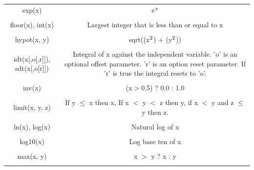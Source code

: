 \begin{longtable}{c c}
exp(x) & \begin{minipage}{20em}
e$\rm{^x}$
\end{minipage}\\ \\

floor(x), int(x) & \begin{minipage}{20em}
Largest integer that is less than or equal to x
\end{minipage}\\ \\

hypot(x, y) & \begin{minipage}{20em}
sqrt((x$\rm{^2}$) + (y$\rm{^2}$))
\end{minipage}\\ \\

idt(x[,o[,r]]), sdt(x[,o[r]]) & \begin{minipage}{20em}
Integral of x against the independent variable. 'o' is an optional offset parameter. 'r' is an option reset parameter. If 'r' is true the integral resets to 'o'.
\end{minipage}\\ \\

inv(x) & \begin{minipage}{20em}
(x$>$0.5) ? 0.0 : 1.0
\end{minipage}\\ \\

limit(x, y, z) & \begin{minipage}{20em}
If y $\leq$ x then x, If x $<$ y $<$ z then y, if x $<$ y and z $\leq$ y then z.  
\end{minipage}\\ \\

ln(x), log(x) & \begin{minipage}{20em}
Natural log of x
\end{minipage}\\ \\

log10(x) & \begin{minipage}{20em}
Log base ten of x
\end{minipage}\\ \\

max(x, y) & \begin{minipage}{20em}
x $>$ y ? x : y
\end{minipage}\\ \\


\end{longtable}
